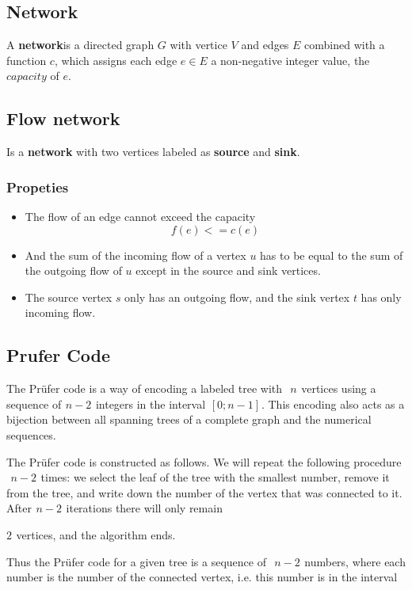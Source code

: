 \subsection{Network}

A \textbf{network}is a directed graph $G$ with vertice $V$ and edges $E$ combined with a function $c$, which assigns each edge $e \in E$ a non-negative integer value, the $capacity$ of $e$. 

\subsection{Flow network}

Is a \textbf{network} with two vertices labeled as \textbf{source} and \textbf{sink}.

\subsubsection{Propeties}
\begin{itemize}
    \item The flow of an edge cannot exceed the capacity $$ f(e) <= c(e) $$
    \item And the sum of the incoming flow of a vertex $u$ has to be equal to the sum of the outgoing flow of $u$ except in the source and sink vertices.
    \item The source vertex $s$ only has an outgoing flow, and the sink vertex $t$ has only incoming flow.
\end{itemize}

\subsection{Prufer Code}

The Prüfer code is a way of encoding a labeled tree with  
$n$  vertices using a sequence of  $n - 2$  integers in the interval  $[0; n-1]$ . This encoding also acts as a bijection between all spanning trees of a complete graph and the numerical sequences.



The Prüfer code is constructed as follows. We will repeat the following procedure  
$n - 2$  times: we select the leaf of the tree with the smallest number, remove it from the tree, and write down the number of the vertex that was connected to it. After  $n - 2$  iterations there will only remain  

$2$  vertices, and the algorithm ends.

Thus the Prüfer code for a given tree is a sequence of  
$n - 2$  numbers, where each number is the number of the connected vertex, i.e. this number is in the interval  

